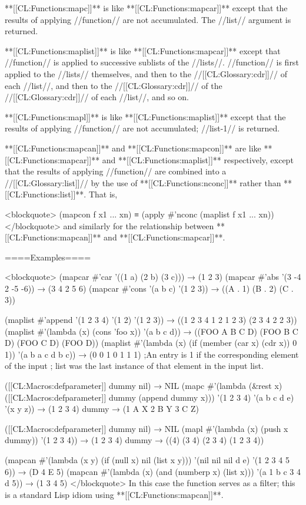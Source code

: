 **[[CL:Functions:mapc]]** is like **[[CL:Functions:mapcar]]** except that the results of applying //function// are not accumulated. The //list// argument is returned.

**[[CL:Functions:maplist]]** is like **[[CL:Functions:mapcar]]** except that //function// is applied to successive sublists of the //lists//. //function// is first applied to the //lists// themselves, and then to the //[[CL:Glossary:cdr]]// of each //list//, and then to the //[[CL:Glossary:cdr]]// of the //[[CL:Glossary:cdr]]// of each //list//, and so on.

**[[CL:Functions:mapl]]** is like **[[CL:Functions:maplist]]** except that the results of applying //function// are not accumulated; //list-1// is returned.


**[[CL:Functions:mapcan]]** and **[[CL:Functions:mapcon]]** are like **[[CL:Functions:mapcar]]** and **[[CL:Functions:maplist]]** respectively, except that the results of applying //function// are combined into a //[[CL:Glossary:list]]// by the use of **[[CL:Functions:nconc]]** rather than **[[CL:Functions:list]]**. That is,

<blockquote> (mapcon f x1 ... xn) ≡ (apply #'nconc (maplist f x1 ... xn)) </blockquote> and similarly for the relationship between **[[CL:Functions:mapcan]]** and **[[CL:Functions:mapcar]]**.

====Examples====

<blockquote> (mapcar #'car '((1 a) (2 b) (3 c))) → (1 2 3) (mapcar #'abs '(3 -4 2 -5 -6)) → (3 4 2 5 6) (mapcar #'cons '(a b c) '(1 2 3)) → ((A . 1) (B . 2) (C . 3))

(maplist #'append '(1 2 3 4) '(1 2) '(1 2 3)) → ((1 2 3 4 1 2 1 2 3) (2 3 4 2 2 3)) (maplist #'(lambda (x) (cons 'foo x)) '(a b c d)) → ((FOO A B C D) (FOO B C D) (FOO C D) (FOO D)) (maplist #'(lambda (x) (if (member (car x) (cdr x)) 0 1)) '(a b a c d b c)) → (0 0 1 0 1 1 1) ;An entry is 1 if the corresponding element of the input ; list was the last instance of that element in the input list.

([[CL:Macros:defparameter]] dummy nil) → NIL (mapc #'(lambda (&rest x) ([[CL:Macros:defparameter]] dummy (append dummy x))) '(1 2 3 4) '(a b c d e) '(x y z)) → (1 2 3 4) dummy → (1 A X 2 B Y 3 C Z)

([[CL:Macros:defparameter]] dummy nil) → NIL (mapl #'(lambda (x) (push x dummy)) '(1 2 3 4)) → (1 2 3 4) dummy → ((4) (3 4) (2 3 4) (1 2 3 4))

(mapcan #'(lambda (x y) (if (null x) nil (list x y))) '(nil nil nil d e) '(1 2 3 4 5 6)) → (D 4 E 5) (mapcan #'(lambda (x) (and (numberp x) (list x))) '(a 1 b c 3 4 d 5)) → (1 3 4 5) </blockquote> In this case the function serves as a filter; this is a standard Lisp idiom using **[[CL:Functions:mapcan]]**.

